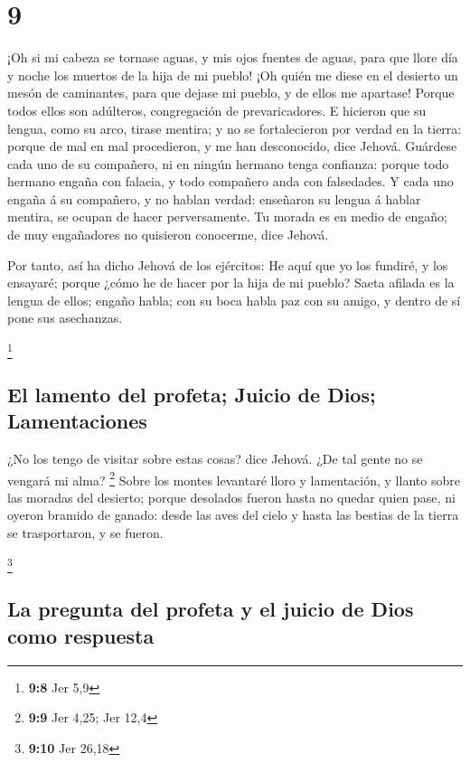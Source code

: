 \hypertarget{section-8}{%
\section{9}\label{section-8}}

 ¡Oh si mi cabeza se tornase aguas, y mis ojos fuentes de
aguas, para que llore día y noche los muertos de la hija de mi pueblo!
 ¡Oh quién me diese en el desierto un mesón de caminantes,
para que dejase mi pueblo, y de ellos me apartase! Porque todos ellos
son adúlteros, congregación de prevaricadores.  E hicieron
que su lengua, como su arco, tirase mentira; y no se fortalecieron por
verdad en la tierra: porque de mal en mal procedieron, y me han
desconocido, dice Jehová.  Guárdese cada uno de su
compañero, ni en ningún hermano tenga confianza: porque todo hermano
engaña con falacia, y todo compañero anda con falsedades.  Y
cada uno engaña á su compañero, y no hablan verdad: enseñaron su lengua
á hablar mentira, se ocupan de hacer perversamente.  Tu
morada es en medio de engaño; de muy engañadores no quisieron conocerme,
dice Jehová.

 Por tanto, así ha dicho Jehová de los ejércitos: He aquí
que yo los fundiré, y los ensayaré; porque ¿cómo he de hacer por la hija
de mi pueblo?  Saeta afilada es la lengua de ellos; engaño
habla; con su boca habla paz con su amigo, y dentro de sí pone sus
asechanzas.

\footnote{\textbf{9:8} Jer 5,9}

\hypertarget{el-lamento-del-profeta-juicio-de-dios-lamentaciones}{%
\subsection{El lamento del profeta; Juicio de Dios;
Lamentaciones}\label{el-lamento-del-profeta-juicio-de-dios-lamentaciones}}

 ¿No los tengo de visitar sobre estas cosas? dice Jehová.
¿De tal gente no se vengará mi alma? \footnote{\textbf{9:9} Jer 4,25;
  Jer 12,4}  Sobre los montes levantaré lloro y
lamentación, y llanto sobre las moradas del desierto; porque desolados
fueron hasta no quedar quien pase, ni oyeron bramido de ganado: desde
las aves del cielo y hasta las bestias de la tierra se trasportaron, y
se fueron.

\footnote{\textbf{9:10} Jer 26,18}

\hypertarget{la-pregunta-del-profeta-y-el-juicio-de-dios-como-respuesta}{%
\subsection{La pregunta del profeta y el juicio de Dios como
respuesta}\label{la-pregunta-del-profeta-y-el-juicio-de-dios-como-respuesta}}

